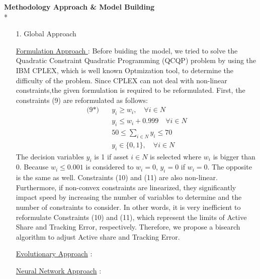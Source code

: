 \documentclass[11pt]{article}
\begin{document}
\textbf{Methodology Approach {\&} Model Building}\\*
\begin{itemize}

\item[1.] Global Approach
	\item[] \underline{Formulation Approach }:
	Before buiding the model, we tried to solve the  Quadratic Constraint Quadratic Programming (QCQP)  problem by using the IBM CPLEX, which is well known Optmization tool, to determine the difficulty of the problem. Since CPLEX can not deal with non-linear constraints,the given formulation is required to be reformulated. 
	First, the constraints (9) are reformulated as follows:
	\begin{align*}
	\text{(9*)} \quad
	& y_i \geq w_i, \quad \forall i \in N \\
	& y_i \leq w_i + 0.999 \quad \forall i \in N \\
	& 50 \leq \sum_{i \in N} y_i \leq 70 \\
	& y_i \in \{0,1\}, \quad \forall i \in N 
	\end{align*}
	The decision variables $y_i$ is 1 if asset $i \in N$ is selected where $w_i$ is bigger than 0. Because $w_i \leq 0.001$ is considered to $w_i = 0$,  $y_i = 0$ if $w_i = 0$. The opposite is the same as well. Constraints (10) and (11) are also non-linear. Furthermore, if non-convex constraints are linearized, they significantly impact speed by increasing the number of variables to determine and the number of constraints to consider. In other words, it is very inefficient to reformulate Constraints (10) and (11), which represent the limits of Active Share and Tracking Error, respectively. Therefore, we propose a bisearch algorithm to adjust Active share and Tracking Error.
	
	
	\item[]\underline{Evolutionary Approach} :
	
	
	\item[]\underline{Neural Network Approach} :
	
	

\end{itemize}
\end{document}
